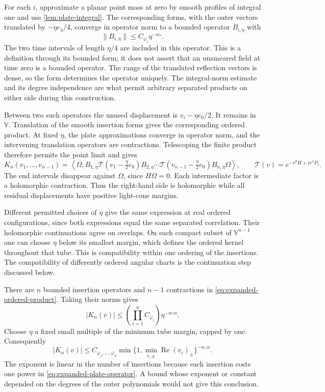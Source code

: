 \documentclass[11pt,letterpaper,reqno]{amsart}
\theoremstyle{definition}
\theoremstyle{remark}
\begin{document}
For each $i$, approximate a planar point mass at zero by smooth
profiles of integral one and use \cref{lem:plate-integral}. The
corresponding forms, with the outer vectors translated by
$-\eta e_4/4$, converge in operator norm to a bounded operator
$B_{i,\eta}$ with
\begin{equation}\label{eq:expanded-plate-operator}
 \|B_{i,\eta}\|\le C_{\varphi_i}\eta^{-w_*}.
\end{equation}
The two time intervals of length $\eta/4$ are included in this
operator. This is a definition through its bounded form; it does not
assert that an unsmeared field at time zero is a bounded operator.
The range of the translated reflection vectors is dense, so the form
determines the operator uniquely. The integral-norm estimate and its
degree independence are what permit arbitrary separated products on
either side during this construction.

Between two such operators the unused displacement is
$v_i-\eta e_0/2$. It remains in $\mathbb V$. Translation of the
smooth insertion forms gives the corresponding ordered product.
At fixed $\eta$, the plate approximations converge in operator norm,
and the intervening translation operators are contractions. Telescoping
the finite product therefore permits the point limit and gives
\begin{equation}\label{eq:expanded-ordered-product}
 K_n(v_1,\ldots,v_{n-1})
 =\left\langle\Omega,
 B_{1,\eta}\mathcal T(v_1-\tfrac\eta2e_0)
 B_{2,\eta}\cdots
 \mathcal T(v_{n-1}-\tfrac\eta2e_0)B_{n,\eta}\Omega
 \right\rangle,
 \qquad \mathcal T(v)=e^{-v^0H+iv^1P_1}.
\end{equation}
The end intervals disappear against $\Omega$, since $H\Omega=0$.
Each intermediate factor is a holomorphic contraction. Thus the
right-hand side is holomorphic while all residual displacements have
positive light-cone margins.

Different permitted choices of $\eta$ give the same expression at
real ordered configurations, since both expressions equal the same
separated correlation. Their holomorphic continuations agree on
overlaps. On each compact subset of $\mathbb V^{n-1}$ one can choose
$\eta$ below its smallest margin, which defines the ordered kernel
throughout that tube. This is compatibility within one ordering of
the insertions. The compatibility of differently ordered angular
charts is the continuation step discussed below.

There are $n$ bounded insertion operators and $n-1$ contractions in
\eqref{eq:expanded-ordered-product}. Taking their norms gives
\[
 |K_n(v)|\le\left(\prod_{i=1}^n C_{\varphi_i}\right)\eta^{-w_*n}.
\]
Choose $\eta$ a fixed small multiple of the minimum tube margin,
capped by one. Consequently
\begin{equation}\label{eq:kernel-margin}
 |K_n(v)|\le C_{\varphi_1,\ldots,\varphi_n}
 \min\{1,\min_{i,\pm}\operatorname{Re}(v_i)_\pm\}^{-w_*n}.
\end{equation}
The exponent is linear in the number of insertions because each
insertion costs one power in \eqref{eq:expanded-plate-operator}.
A bound whose exponent or constant depended on the degrees of the
outer polynomials would not give this conclusion.
\end{document}
